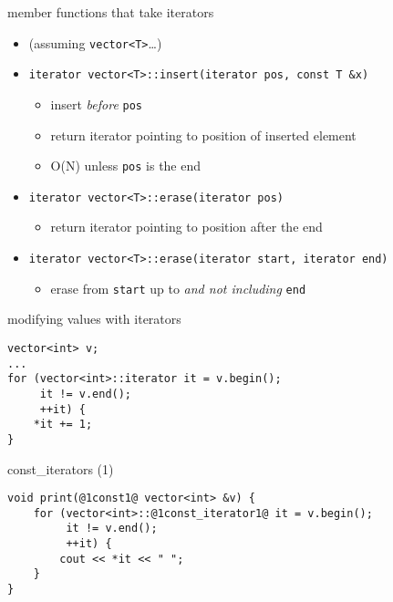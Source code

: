 \begin{frame}[fragile,label=moreItMethods]{member functions that take iterators}
\lstset{
    language=C++,
    style=smaller
}
\begin{itemize}
\item (assuming \lstinline|vector<T>|\ldots)
\item \lstinline|iterator vector<T>::insert(iterator pos, const T &x)|
\begin{itemize}
    \item insert \textit{before} \texttt{pos}
    \item return iterator pointing to position of inserted element
    \item O(N) unless \texttt{pos} is the end
\end{itemize}
\item \lstinline|iterator vector<T>::erase(iterator pos)| 
    \begin{itemize}
    \item return iterator pointing to position after the end
    \end{itemize}
\item \lstinline|iterator vector<T>::erase(iterator start, iterator end)| 
    \begin{itemize}
        \item erase from \texttt{start} up to \textit{and not including} \texttt{end}
    \end{itemize}
\end{itemize}
\end{frame}

\begin{frame}[fragile,label=modWithIt]{modifying values with iterators}
\lstset{language=C++,style=small}
\begin{lstlisting}
vector<int> v;
...
for (vector<int>::iterator it = v.begin();
     it != v.end();
     ++it) {
    *it += 1;
}
\end{lstlisting}
\end{frame}

\begin{frame}[fragile,label=constIt1]{const\_iterators (1)}
\begin{lstlisting}
void print(@1const1@ vector<int> &v) {
    for (vector<int>::@1const_iterator1@ it = v.begin();
         it != v.end();
         ++it) {
        cout << *it << " ";
    }
}
\end{lstlisting}
\end{frame}

